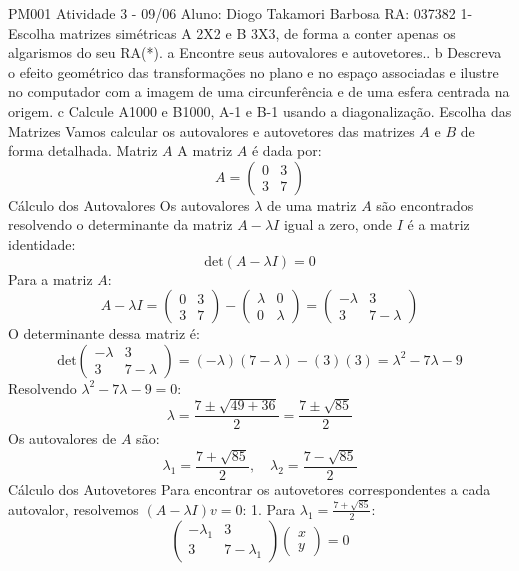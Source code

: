 
PM001 Atividade 3 - 09/06
Aluno: Diogo Takamori Barbosa 
RA: 037382
1-Escolha matrizes simétricas A 2X2 e B 3X3, de forma a conter apenas os algarismos do seu RA(*).
a Encontre seus autovalores e autovetores..
b Descreva o efeito geométrico das transformações no plano e no espaço associadas e ilustre no
computador com a imagem de uma circunferência e de uma esfera centrada na origem.
c Calcule A1000 e B1000, A-1 e B-1 usando a diagonalização.
Escolha das Matrizes
Vamos calcular os autovalores e autovetores das matrizes \(A\) e \(B\) de forma detalhada. 
Matriz \(A\)
A matriz \(A\) é dada por:
\[ A = \left(\begin{array}{cc} 0 & 3 \\ 3 & 7 \end{array}\right) \]
Cálculo dos Autovalores
Os autovalores \(\lambda\) de uma matriz \(A\) são encontrados resolvendo o determinante da matriz \(A - \lambda I\) igual a zero, onde \(I\) é a matriz identidade:
\[
\text{det}(A - \lambda I) = 0
\]
Para a matriz \(A\):
\[
A - \lambda I = \left(\begin{array}{cc} 0 & 3 \\ 3 & 7 \end{array}\right) - \left(\begin{array}{cc} \lambda & 0 \\ 0 & \lambda \end{array}\right) = \left(\begin{array}{cc} -\lambda & 3 \\ 3 & 7-\lambda \end{array}\right)
\]
O determinante dessa matriz é:
\[
\text{det}\left(\begin{array}{cc} -\lambda & 3 \\ 3 & 7-\lambda \end{array}\right) = (-\lambda)(7-\lambda) - (3)(3) = \lambda^2 - 7\lambda - 9
\]
Resolvendo \(\lambda^2 - 7\lambda - 9 = 0\):
\[
\lambda = \frac{7 \pm \sqrt{49 + 36}}{2} = \frac{7 \pm \sqrt{85}}{2}
\]
Os autovalores de \(A\) são:
\[
\lambda_1 = \frac{7 + \sqrt{85}}{2}, \quad \lambda_2 = \frac{7 - \sqrt{85}}{2}
\]
Cálculo dos Autovetores
Para encontrar os autovetores correspondentes a cada autovalor, resolvemos \((A - \lambda I)v = 0\):
1. Para \(\lambda_1 = \frac{7 + \sqrt{85}}{2}\):
\[
\left(\begin{array}{cc} -\lambda_1 & 3 \\ 3 & 7-\lambda_1 \end{array}\right) \left(\begin{array}{c} x \\ y \end{array}\right) = 0
\]
